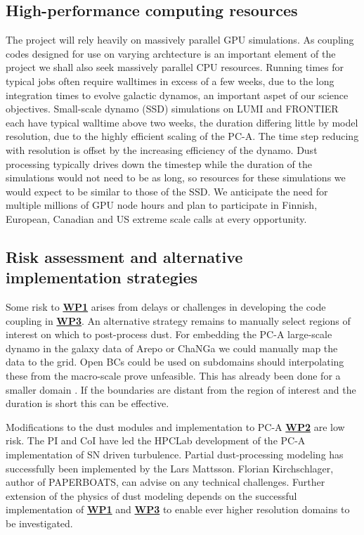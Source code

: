 \documentclass[a4paper,12pt]{article}
\newcommand{\wpref}[1]{\protect\hyperlink{wp#1}{\textbf{WP#1}}}
\begin{document}
\subsection{High-performance computing resources}

The project will rely heavily on massively parallel GPU simulations. As
coupling codes designed for use on varying archtecture is an important element
of the project we shall also seek massively parallel CPU resources.  Running
times for typical jobs often require walltimes in excess of a few weeks, due to
the long integration times to evolve galactic dynamos, an important
aspet of our science objectives. Small-scale dynamo (SSD) simulations on LUMI and
FRONTIER each have typical walltime above two weeks, the duration differing
little by model resolution, due to the highly efficient
scaling of the PC-A. The time step reducing with resolution is offset by the increasing efficiency of the dynamo.
Dust processing typically drives down the timestep while the duration of the
simulations would not need to be as long, so resources for these simulations we
would expect to be similar to those of the SSD.  We anticipate
the need for multiple millions of GPU node hours and plan to participate in
Finnish, European, Canadian and US extreme scale calls at every opportunity.

\subsection{Risk assessment and alternative implementation strategies}

Some risk to \wpref{1} arises from delays or challenges in developing the code
coupling in \wpref{3}. An alternative strategy remains to manually select
regions of interest on which to post-process dust.  For embedding the PC-A
large-scale dynamo in the galaxy data of Arepo or ChaNGa we could manually map
the data to the grid. Open BCs could be used on subdomains should interpolating
these from the macro-scale prove unfeasible.  This has already been done for a
smaller domain \citep[][and paper in preparation]{Aurora:2025}.  If the
boundaries are distant from the region of interest and the duration is short
this can be effective.

Modifications to the dust modules and implementation to PC-A \wpref{2} are low
risk.  The PI and CoI have led the HPCLab development of the PC-A
implementation of SN driven turbulence. Partial dust-processing modeling has
successfully been implemented by the Lars Mattsson. Florian Kirchschlager, author of
PAPERBOATS, can advise on any technical challenges. Further extension of the
physics of dust modeling depends on the successful implementation of \wpref{1}
and \wpref{3} to enable ever higher resolution domains to be investigated. 
\end{document}

